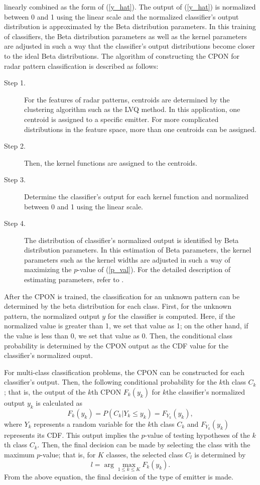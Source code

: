 \documentclass[runningheads,a4paper]{llncs}
\begin{document}
linearly combined as the form of (\ref{y_hat}). The output of (\ref{y_hat}) is normalized between 0 and 1 using the linear scale and 
the normalized classifier's output distribution is approximated by the Beta distribution parameters.
In this training of classifiers, the Beta distribution parameters as well as the kernel parameters are adjusted
in such a way that the classifier's output distributions become closer to the ideal Beta distributions. 
The algorithm of constructing the CPON for radar pattern classification is described as follows:
\begin{description}
\item[Step 1.] For the features of radar patterns, centroids are determined by the clustering algorithm such as the LVQ method.
  In this application, one centroid is assigned to a specific emitter. For more complicated distributions in the feature space, more than one
  centroids can be assigned.
\item[Step 2.] Then, the kernel functions are assigned to the centroids.
\item[Step 3.] Determine the classifier's output for each kernel function and normalized between 0 and 1 using the linear scale.
\item[Step 4.] The distribution of classifier's normalized output is identified by Beta distribution parameters. In this estimation of
  Beta parameters, the kernel parameters such as the kernel widths are adjusted in such a way of maximizing the $p$-value of (\ref{p_val}).
  For the detailed description of estimating parameters, refer to \cite{cit:PK}.
\end{description}

After the CPON is trained, the classification for an unknown pattern can be determined by the beta distribution for each class.
First, for the unknown pattern, the normalized output $y$ for the classifier is computed.
Here, if the normalized value is greater than 1, we set that value as 1; on the other hand, if the value is less than 0, we set that value as 0.
Then, the conditional class probability is
determined by the CPON output as the CDF value for the classifier's normalized ouput.

For multi-class classification problems, the CPON can be constructed for each classifier's output. Then, the following conditional probability for
the $k$th class $C_k$; that is, the output of the $k$th CPON $F_k(y_k)$ for $k$the classifier's normalized output $y_k$ is calculated as
\begin{equation}
F_k(y_k) = P(C_k| Y_k\le y_k) = F_{Y_k}(y_k),
\end{equation}
where $Y_k$ represents a random variable for the $k$th class $C_k$ and $F_{Y_k}(y_k)$ represents its CDF.
This output implies the $p$-value of testing hypotheses of the $k$th class $C_k$. 
Then, the final decision can be made by selecting the class with the maximum $p$-value; that is, for $K$ classes, the selected class $C_l$ is
determined by
\begin{equation}
l = \arg \max_{1\le k\le K} F_k(y_k).
\end{equation}
From the above equation, the final decision of the type of emitter is made.
\end{document}
